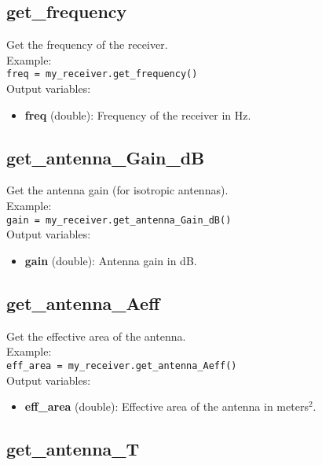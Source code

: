 \subsection{get\_frequency}

Get the frequency of the receiver.\\

Example:\\

\texttt{freq = my\_receiver.get\_frequency()}\\

Output variables:
\begin{itemize}
\item {\bf freq} (double): Frequency of the receiver in Hz.
\end{itemize}


\subsection{get\_antenna\_Gain\_dB}

Get the antenna gain (for isotropic antennas).\\

Example:\\

\texttt{gain = my\_receiver.get\_antenna\_Gain\_dB()}\\

Output variables:
\begin{itemize}
\item {\bf gain} (double): Antenna gain in dB.
\end{itemize}


\subsection{get\_antenna\_Aeff}

Get the effective area of the antenna.\\

Example:\\

\texttt{eff\_area = my\_receiver.get\_antenna\_Aeff()}\\

Output variables:
\begin{itemize}
\item {\bf eff\_area} (double): Effective area of the antenna in meters$^2$.
\end{itemize}


\subsection{get\_antenna\_T}

